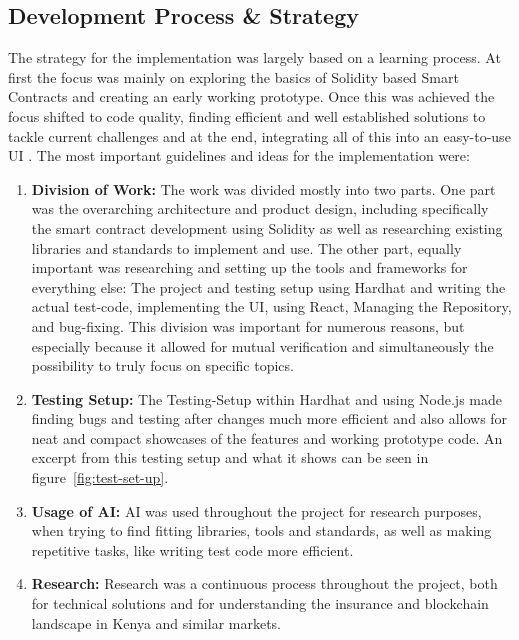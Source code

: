 \documentclass[11pt,a4paper]{article}
\begin{document}
    \subsection{Development Process \& Strategy}\label{subsec:dev-strategy}
    The strategy for the implementation was largely based on a learning process.
    At first the focus was mainly on exploring the basics of Solidity based Smart Contracts and creating an early working prototype.
    Once this was achieved the focus shifted to code quality, finding efficient and well established solutions to tackle current challenges and at the end, integrating all of this into an easy-to-use UI .
    The most important guidelines and ideas for the implementation were:
    \begin{enumerate}[1]
        \item \textbf{Division of Work:} The work was divided mostly into two parts.
        One part was the overarching architecture and product design, including specifically the smart contract development using Solidity as well as researching existing libraries and standards to implement and use.
        The other part, equally important was researching and setting up the tools and frameworks for everything else: The project and testing setup using Hardhat and writing the actual test-code, implementing the UI, using React, Managing the Repository, and bug-fixing.
        This division was important for numerous reasons, but especially because it allowed for mutual verification and simultaneously the possibility to truly focus on specific topics.
        \item \textbf{Testing Setup:} The Testing-Setup within Hardhat and using Node.js made finding bugs and testing after changes much more efficient and also allows for neat and compact showcases of the features and working prototype code.
        An excerpt from this testing setup and what it shows can be seen in figure~\ref{fig:test-set-up}.
        \item \textbf{Usage of AI:} AI was used throughout the project for research purposes, when trying to find fitting libraries, tools and standards, as well as making repetitive tasks, like writing test code more efficient.
        \item \textbf{Research:} Research was a continuous process throughout the project, both for technical solutions and for understanding the insurance and blockchain landscape in Kenya and similar markets.
    \end{enumerate}
\end{document}
